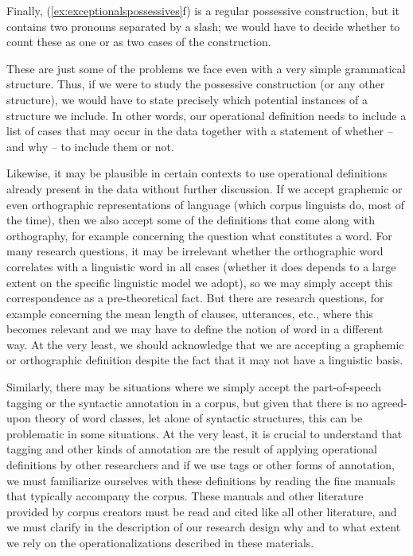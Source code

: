 Finally, (\ref{ex:exceptionalspossessives}f) is a regular possessive  construction, but it contains two pronouns  separated by a slash; we would have to decide whether to count these as one or as two cases of the construction.

These are just some of the problems we face even with a very simple grammatical structure. Thus, if we were to study the possessive  construction (or any other structure), we would have to state precisely which potential instances of a structure we include. In other words, our operational  definition needs to include a list of cases that may occur in the data together with a statement of whether -- and why -- to include them or not.

Likewise, it may be plausible in certain contexts to use operational  definitions already present in the data without further discussion. If we accept graphemic or even orthographic representations of language (which corpus linguists do, most of the time), then we also accept some of the definitions that come along with orthography, for example concerning the question what constitutes a word. For many research questions, it may be irrelevant whether the orthographic word correlates  with a linguistic word in all cases (whether it does depends to a large extent on the specific linguistic model we adopt), so we may simply accept this correspondence as a pre\hyp{}theoretical fact. But there are research questions, for example concerning the mean  length  of clauses, utterances, etc., where this becomes relevant and we may have to define the notion of word in a different way. At the very least, we should acknowledge that we are accepting a graphemic or orthographic definition despite the fact that it may not have a linguistic basis.

Similarly, there may be situations where we simply accept the part\hyp{}of\hyp{}speech tagging  or the syntactic  annotation  in a corpus, but given that there is no agreed\hyp{}upon theory of word classes, let alone of syntactic structures, this can be problematic in some situations. At the very least, it is crucial to understand that tagging and other kinds of annotation  are the result of applying operational  definitions by other researchers and if we use tags or other forms of annotation, we must familiarize ourselves with these definitions by reading the fine manuals that typically accompany the corpus. These manuals and other literature provided by corpus creators must be read and cited like all other literature, and we must clarify in the description of our research design  why and to what extent we rely on the operationalizations described in these materials.

